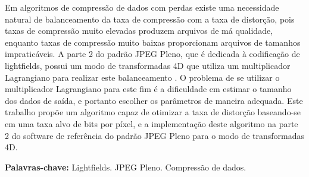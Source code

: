 \begin{resumo}[Resumo]
    Em algoritmos de compressão de dados com perdas existe uma necessidade natural de balanceamento da taxa de compressão com a taxa de distorção,
    pois taxas de compressão muito elevadas produzem arquivos de má qualidade, enquanto taxas de compressão muito baixas proporcionam arquivos de
    tamanhos impraticáveis.
    A parte 2 do padrão JPEG Pleno, que é dedicada à codificação de lightfields, possui um modo de transformadas 4D que utiliza um multiplicador
    Lagrangiano para realizar este balanceamento \cite{4d_codec}. O problema de se utilizar o multiplicador Lagrangiano para este fim é a dificuldade em estimar
    o tamanho dos dados de saída, e portanto escolher os parâmetros de maneira adequada. Este trabalho propõe um algoritmo capaz de otimizar a
    taxa de distorção baseando-se em uma taxa alvo de bits por píxel, e a implementação deste algoritmo na parte 2 do software de referência do
    padrão JPEG Pleno para o modo de transformadas 4D.


    \vspace{\baselineskip} 
    \textbf{Palavras-chave:} Lightfields. JPEG Pleno. Compressão de dados.
\end{resumo}
